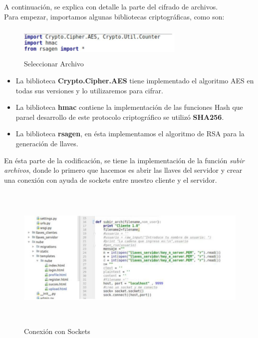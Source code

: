 A continuación, se explica con detalle la parte del cifrado de archivos. \\
Para empezar, importamos algunas bibliotecas criptográficas, como son:

		\begin{figure}[H]
			\centering
			\includegraphics[width=8cm, height=1.5cm]{./images/Interfaz/07.jpg}
			\caption{Seleccionar Archivo}
			\label{fig:6-4-7} 
			\end{figure} 


\begin{itemize}
	\item  La biblioteca \textbf{Crypto.Cipher.AES} tiene implementado el algoritmo AES en todas sus versiones y lo utilizaremos para cifrar.
	\item  La biblioteca \textbf{hmac} contiene la implementación de las funciones Hash que parael desarrollo de este protocolo criptográfico se utilizó \textbf{SHA256}.
	\item La biblioteca \textbf{rsagen}, en ésta implementamos el algoritmo de RSA para la generación de llaves.

\end{itemize}



En ésta parte de la codificación, se tiene la implementación de la función \textit{subir archivos}, donde lo primero que hacemos es abrir las llaves del servidor y crear una conexión con ayuda de sockets entre nuestro cliente y el servidor.
			\begin{figure}[H]
			\centering
			\includegraphics[width=17cm, height=7cm]{./images/Interfaz/08.jpg}
			\caption{Conexión con Sockets}
			\label{fig:6-4-8} 
			\end{figure}



